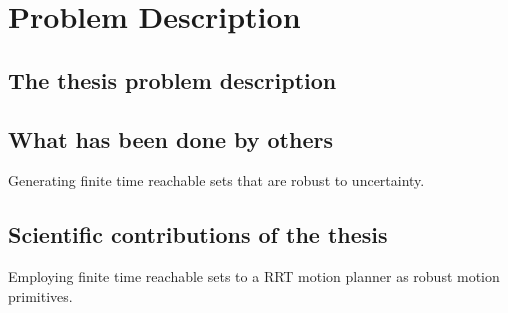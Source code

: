 \chapter{Problem Description}

\section{The thesis problem description}


\section{What has been done by others}

Generating finite time reachable sets that are robust to uncertainty.

\section{Scientific contributions of the thesis}

Employing finite time reachable sets to a \ac{RRT} motion planner as robust motion
primitives.

